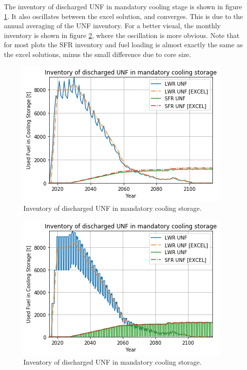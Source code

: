 The inventory of discharged \gls{UNF} in mandatory cooling stage is shown
in figure \ref{fig:fuel_discharge}. It also oscillates between the excel solution,
and converges. This is due to the annual averaging of
the \gls{UNF} inventory. For a better visual, the monthly inventory is shown
in figure \ref{fig:fuel_discharge_monthly}, where the oscillation is more obvious.
Note that for most plots the \gls{SFR} inventory and fuel loading is almost
exactly the same as the excel solutions, minus the small difference due to core
size.

\begin{figure}[htbp!]
    \begin{center}
        \includegraphics[scale=0.6]{./images/results_18/fuel_discharge.png}
    \end{center}
        \caption{Inventory of discharged \gls{UNF} in mandatory cooling storage.}
    \label{fig:fuel_discharge}
\end{figure}


\begin{figure}[htbp!]
    \begin{center}
        \includegraphics[scale=0.6]{./images/results_18/fuel_discharge_monthly.png}
    \end{center}
        \caption{Inventory of discharged \gls{UNF} in mandatory cooling storage.}
    \label{fig:fuel_discharge_monthly}
\end{figure}



